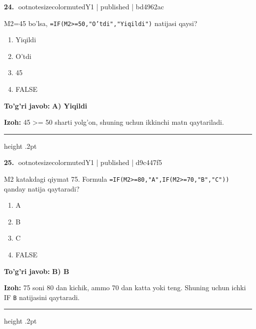 \documentclass[10pt,a4paper]{article}
\begin{document}
\textbf{\color{ink}24.} {ootnotesizecolor{muted}Y1 | published | bd4962ac}
\par
M2=45 bo'lsa, \texttt{=IF(M2\textgreater{}=50,"O'tdi","Yiqildi")} natijasi qaysi?
\begin{enumerate}[label=\Alph*),leftmargin=9mm]
\item Yiqildi
\item O'tdi
\item 45
\item FALSE
\end{enumerate}
\begin{tcolorbox}[enhanced,breakable,colback=teal!4,colframe=teal!55!black,boxrule=0.45pt,arc=1.2mm,left=2.8mm,right=2.8mm,top=2mm,bottom=2mm]
\textbf{\color{teal}To'g'ri javob:} \textbf{A) Yiqildi}
\par\smallskip
\textbf{Izoh:} 45 \textgreater{}= 50 sharti yolg'on, shuning uchun ikkinchi matn qaytariladi.
\end{tcolorbox}
\vspace{2mm}\hrule height .2pt\vspace{2mm}

\textbf{\color{ink}25.} {ootnotesizecolor{muted}Y1 | published | d9c447f5}
\par
M2 katakdagi qiymat 75. Formula \texttt{=IF(M2\textgreater{}=80,"A",IF(M2\textgreater{}=70,"B","C"))} qanday natija qaytaradi?
\begin{enumerate}[label=\Alph*),leftmargin=9mm]
\item A
\item B
\item C
\item FALSE
\end{enumerate}
\begin{tcolorbox}[enhanced,breakable,colback=teal!4,colframe=teal!55!black,boxrule=0.45pt,arc=1.2mm,left=2.8mm,right=2.8mm,top=2mm,bottom=2mm]
\textbf{\color{teal}To'g'ri javob:} \textbf{B) B}
\par\smallskip
\textbf{Izoh:} 75 soni 80 dan kichik, ammo 70 dan katta yoki teng. Shuning uchun ichki IF \texttt{B} natijasini qaytaradi.
\end{tcolorbox}
\vspace{2mm}\hrule height .2pt\vspace{2mm}
\end{document}
